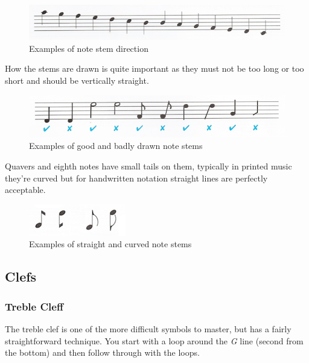 \begin{figure}[h!]
  \includegraphics[width=\linewidth]{gfx/basic/stems-chromatic.png}
  \centering
  \caption{Examples of note stem direction}
  \label{fig:StemsChromatic}
\end{figure}

How the stems are drawn is quite important as they must not be too long or too short and should be vertically straight.

\begin{figure}[h!]
  \includegraphics[width=\linewidth]{gfx/basic/stems-good-bad.png}
  \centering
  \caption{Examples of good and badly drawn note stems}
  \label{fig:StemsGoodBad}
\end{figure}

Quavers and eighth notes have small tails on them, typically in printed music they're curved but for handwritten notation straight lines are perfectly acceptable.

\begin{figure}[h!]
  \includegraphics[width=0.4\linewidth]{gfx/basic/stems-curved.png}
  \centering
  \caption{Examples of straight and curved note stems}
  \label{fig:StemsStraightCurved}
\end{figure}

\subsection{Clefs}

\subsubsection{Treble Cleff}

The treble clef is one of the more difficult symbols to master, but has a fairly straightforward technique. You start with a loop around the \emph{G} line (second from the bottom) and then follow through with the loops.

